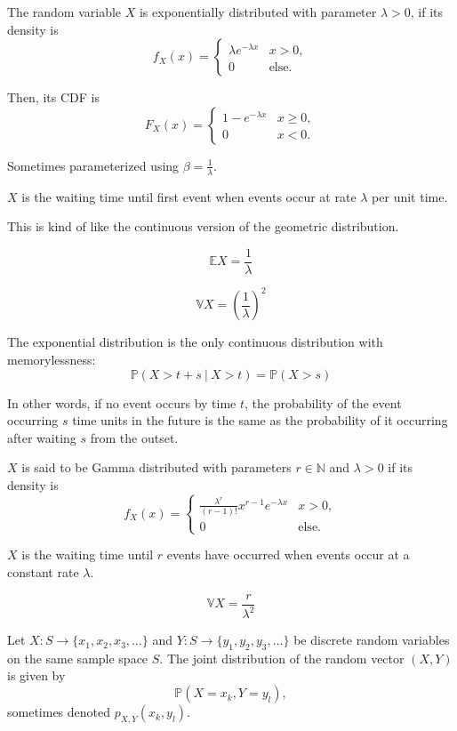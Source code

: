 \documentclass{article}
\begin{document}
\medskip
{}

    The random variable $X$ is exponentially distributed with parameter $\lambda > 0$, if its density is $$f_X(x) = \begin{cases} \lambda e^{-\lambda x} & x > 0, \\ 0 & \text{else.} \end{cases}$$
    
    Then, its CDF is $$F_X(x) = \begin{cases} 1 - e^{-\lambda x} & x \geq 0, \\ 0 & x < 0. \end{cases}$$
    
    Sometimes parameterized using $\beta = \frac1\lambda$.
    
    $X$ is the waiting time until first event when events occur at rate $\lambda$ per unit time.
    
    This is kind of like the continuous version of the geometric distribution.
    
    $$\mathbb EX = \frac1\lambda$$

    $$\mathbb VX = \left(\frac1\lambda\right)^2$$
    
    The exponential distribution is the only continuous distribution with memorylessness: 
    $$\mathbb P(X > t + s~|~X > t) = \mathbb P(X > s)$$
    
    In other words, if no event occurs by time $t$, the probability of the event occurring $s$ time units in the future is the same as the probability of it occurring after waiting $s$ from the outset. 

\medskip
{}

    $X$ is said to be Gamma distributed with parameters $r \in \mathbb N$ and $\lambda > 0$ if its density is $$f_X(x) = \begin{cases} \frac{\lambda^r}{(r-1)!}x^{r-1}e^{-\lambda x} & x > 0, \\ 0 & \text{else.} \end{cases}$$

    $X$ is the waiting time until $r$ events have occurred when events occur at a constant rate $\lambda$.

    
    $$\mathbb VX = \frac r {\lambda^2}$$
    
\medskip
{}

    Let $X: S \to \{x_1, x_2, x_3, \hdots\}$ and $Y: S \to \{y_1, y_2, y_3, \hdots\}$ be discrete random variables on the same sample space $S$. The joint distribution of the random vector $(X, Y)$ is given by $$\mathbb P(X = x_k, Y=y_l),$$ sometimes denoted $p_{X,Y}(x_k,y_l)$.
    
\end{document}
